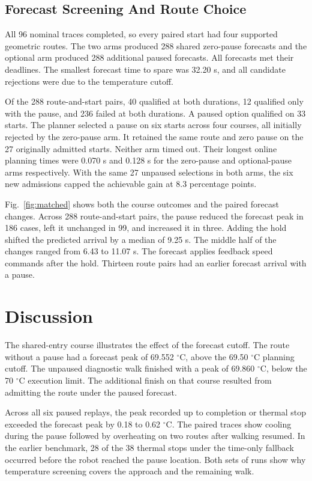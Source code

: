 \documentclass{ieeeaccess}
\begin{document}
\subsection{Forecast Screening And Route Choice}

All 96 nominal traces completed, so every paired start had four supported geometric routes. The two arms produced 288 shared zero-pause forecasts and the optional arm produced 288 additional paused forecasts. All forecasts met their deadlines. The smallest forecast time to spare was 32.20 s, and all candidate rejections were due to the temperature cutoff.

Of the 288 route-and-start pairs, 40 qualified at both durations, 12 qualified only with the pause, and 236 failed at both durations. A paused option qualified on 33 starts. The planner selected a pause on six starts across four courses, all initially rejected by the zero-pause arm. It retained the same route and zero pause on the 27 originally admitted starts. Neither arm timed out. Their longest online planning times were 0.070 s and 0.128 s for the zero-pause and optional-pause arms respectively. With the same 27 unpaused selections in both arms, the six new admissions capped the achievable gain at 8.3 percentage points.

Fig.~\ref{fig:matched} shows both the course outcomes and the paired forecast changes. Across 288 route-and-start pairs, the pause reduced the forecast peak in 186 cases, left it unchanged in 99, and increased it in three. Adding the hold shifted the predicted arrival by a median of 9.25 s. The middle half of the changes ranged from 6.43 to 11.07 s. The forecast applies feedback speed commands after the hold. Thirteen route pairs had an earlier forecast arrival with a pause.

\section{Discussion}

The shared-entry course illustrates the effect of the forecast cutoff. The route without a pause had a forecast peak of 69.552 \ensuremath{{}^{\circ}\mathrm{C}}, above the 69.50 \ensuremath{{}^{\circ}\mathrm{C}} planning cutoff. The unpaused diagnostic walk finished with a peak of 69.860 \ensuremath{{}^{\circ}\mathrm{C}}, below the 70 \ensuremath{{}^{\circ}\mathrm{C}} execution limit. The additional finish on that course resulted from admitting the route under the paused forecast.

Across all six paused replays, the peak recorded up to completion or thermal stop exceeded the forecast peak by 0.18 to 0.62 \ensuremath{{}^{\circ}\mathrm{C}}. The paired traces show cooling during the pause followed by overheating on two routes after walking resumed. In the earlier benchmark, 28 of the 38 thermal stops under the time-only fallback occurred before the robot reached the pause location. Both sets of runs show why temperature screening covers the approach and the remaining walk.
\end{document}
